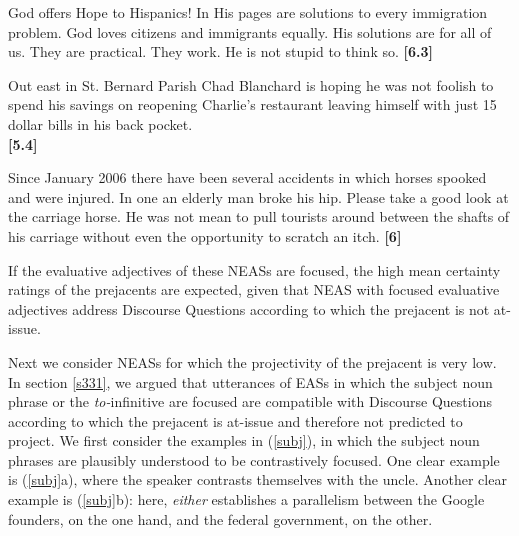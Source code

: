 \documentclass[11pt,fleqn]{article}
\newcommand{\6}{\mbox{$[\hspace*{-.6mm}[$}}
\newcommand{\9}{\mbox{$]\hspace*{-.6mm}]$}}
\begin{document}
\begin{exe}
\ex\label{ex1b}
\begin{xlist}

\ex God offers Hope to Hispanics! In His pages are solutions to every
immigration problem. God loves citizens and immigrants equally. His
solutions are for all of us. They are practical. They work. He is not
stupid to think so. \hfill {\bf [6.3]}

\ex Out east in St. Bernard Parish  Chad Blanchard is hoping he was not
foolish to spend his savings on reopening Charlie's restaurant
leaving himself with just 15 dollar bills in his back pocket. \\ \hspace*{.2cm} \hfill
{\bf [5.4]}




\ex Since January 2006  there have been several accidents in which
horses spooked and were injured. In one an elderly man broke his hip.
Please take a good look at the carriage horse. He was not mean
to pull tourists around between the shafts of his carriage without even
the opportunity to scratch an itch. \hfill {\bf [6]}



\end{xlist}
\end{exe} 
If the evaluative adjectives of these NEASs are focused, the high mean certainty ratings of the prejacents are expected, given that NEAS with focused evaluative adjectives address Discourse Questions according to which the prejacent is not at-issue.

Next we consider NEASs for which the projectivity of the prejacent is very low. In section \ref{s331}, we argued that utterances of EASs in which the subject noun phrase or the {\em to-}infinitive are focused are compatible with Discourse Questions according to which the prejacent is at-issue and therefore not predicted to project. We first consider the examples in (\ref{subj}), in which the subject noun phrases are plausibly understood to be contrastively focused. One clear example is (\ref{subj}a), where the speaker contrasts themselves with the uncle. Another clear example is (\ref{subj}b): here, {\em either} establishes a parallelism between the Google founders, on the one hand, and the federal government, on the other.
\end{document}
